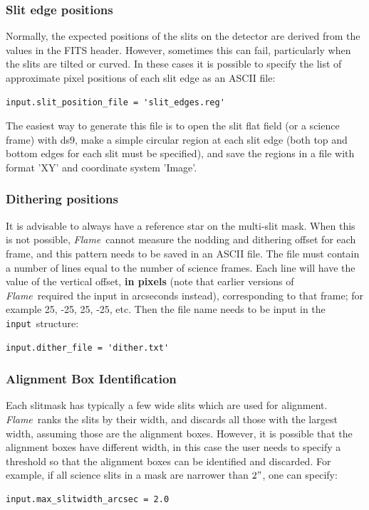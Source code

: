 \documentclass[a4paper]{article}
\newcommand{\flame}{\emph{Flame}}
\newcommand{\inp}{\texttt{input}}
\begin{document}
\begin{sloppypar}
\subsubsection{Slit edge positions}
Normally, the expected positions of the slits on the detector are derived from the values in the FITS header. However, sometimes this can fail, particularly when the slits are tilted or curved. In these cases it is possible to specify the list of approximate pixel positions of each slit edge as an ASCII file:
\begin{lstlisting}
input.slit_position_file = 'slit_edges.reg'
\end{lstlisting}
The easiest way to generate this file is to open the slit flat field (or a science frame) with ds9, make a simple circular region at each slit edge (both top and bottom edges for each slit must be specified), and save the regions in a file with format 'XY' and coordinate system 'Image'.


\subsubsection{Dithering positions}
\label{sec:manual_dithering}
It is advisable to always have a reference star on the multi-slit mask. When this is not possible, \flame\ cannot measure the nodding and dithering offset for each frame, and this pattern needs to be saved in an ASCII file. The file must contain a number of lines equal to the number of science frames. Each line will have the value of the vertical offset, \textbf{in pixels} (note that earlier versions of \flame\ required the input in arcseconds instead), corresponding to that frame; for example 25, -25, 25, -25, etc. Then the file name needs to be input in the \inp\ structure:
\begin{lstlisting}
input.dither_file = 'dither.txt'
\end{lstlisting}


\subsubsection{Alignment Box Identification}
Each slitmask has typically a few wide slits which are used for alignment. \flame\ ranks the slits by their width, and discards all those with the largest width, assuming those are the alignment boxes. However, it is possible that the alignment boxes have different width, in this case the user needs to specify a threshold so that the alignment boxes can be identified and discarded. For example, if all science slits in a mask are narrower than $2"$, one can specify:
\begin{lstlisting}
input.max_slitwidth_arcsec = 2.0
\end{lstlisting}



\end{sloppypar}
\end{document}
